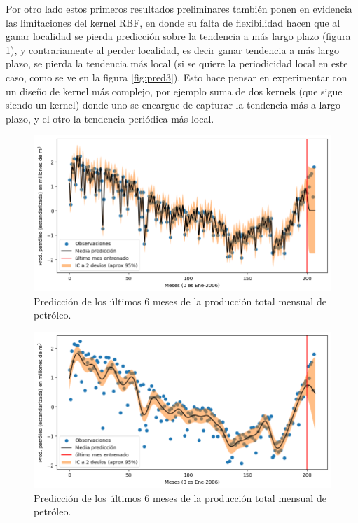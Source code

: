 \documentclass[a4paper]{article}
\begin{document}
Por otro lado estos primeros resultados preliminares también ponen en evidencia las limitaciones del kernel RBF, en donde su falta de flexibilidad hacen que al ganar localidad se pierda predicción sobre la tendencia a más largo plazo (figura \ref{fig:pred1}), y contrariamente al perder localidad, es decir ganar tendencia a más largo plazo, se pierda la tendencia más local (si se quiere la periodicidad local en este caso, como se ve en la figura \ref{fig:pred3}). Esto hace pensar en experimentar con un diseño de kernel más complejo, por ejemplo suma de dos kernels (que sigue siendo un kernel) donde uno se encargue de capturar la tendencia más a largo plazo, y el otro la tendencia periódica más local.

\begin{figure}[H]
	\centering
	\includegraphics[trim={0cm 0cm 0cm 0cm},clip,width=\textwidth]{pred1.png}
	\caption{Predicción de los últimos 6 meses de la producción total mensual de petróleo.}
	\label{fig:pred1}
\end{figure}

\begin{figure}[H]
	\centering
	\includegraphics[trim={0cm 0cm 0cm 0cm},clip,width=\textwidth]{pred2.png}
	\caption{Predicción de los últimos 6 meses de la producción total mensual de petróleo.}
	\label{fig:pred2}
\end{figure}
\end{document}
